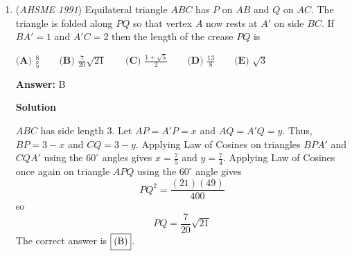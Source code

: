 \begin{enumerate}
 
            \begin{itemize}
        \item Replacing $3$ black marbles with $1$ black marble results in a loss of $2$ black marbles.
        \item Replacing $2$ black marbles and $1$ white marble with $1$ black marble and $1$ white marble results in a loss of $1$ black marble.
        \item Replacing $1$ black marble and $2$ white marbles with $2$ white marbles results in a loss of $1$ black marble.
        \item Replacing $3$ white marbles with $1$ white marble with $2$ black marbles results in a loss of $2$ white marbles and a gain of $1$ black marble.
            \end{itemize}
            Notice that only the fourth operation changes the number of white marbles.  Since this operation reduces the number of white marbles by $2$ each time, the number of white marbles must always be even.  This eliminates choices (D) and (E).

 Also, notice that any operation which removes at least one white marble adds at least one white marble back to the urn.  Therefore, it is impossible to remove all the white marbles.  This eliminates choices (A) and (C).

 Therefore, only $\boxed{\textbf{(B)}\text{ 2 white}}$ marbles could be the contents of the urn at some point. If the fourth operation is performed $49$ times and then the third operation is performed $149$ times, the urn will contain $2$ white marbles.

 


 


	\item (\textit{AHSME 1991}) Equilateral triangle $ABC$ has $P$ on $AB$ and $Q$ on $AC$. The triangle is folded along $PQ$ so that vertex $A$ now rests at $A'$ on side $BC$. If $BA'=1$ and $A'C=2$ then the length of the crease $PQ$ is


 $\textbf{(A) } \frac{8}{5} \qquad \textbf{(B) } \frac{7}{20}\sqrt{21} \qquad \textbf{(C) } \frac{1+\sqrt{5}}{2} \qquad \textbf{(D) } \frac{13}{8} \qquad \textbf{(E) } \sqrt{3}$

 \textbf{Answer: }B



\textbf{Solution}

$ABC$ has side length $3$. Let $AP=A'P=x$ and $AQ=A'Q=y$. Thus, $BP=3-x$ and $CQ=3-y$. Applying Law of Cosines on triangles $BPA'$ and $CQA'$ using the $60^{\circ}$ angles gives $x=\frac{7}{5}$ and $y=\frac{7}{4}$. Applying Law of Cosines once again on triangle $APQ$ using the $60^{\circ}$ angle gives 
 \[PQ^2=\frac{(21)(49)}{400}\] so 
 \[PQ=\frac{7}{20}\sqrt{21}\] The correct answer is $\fbox{(B)}$.


\end{enumerate}
